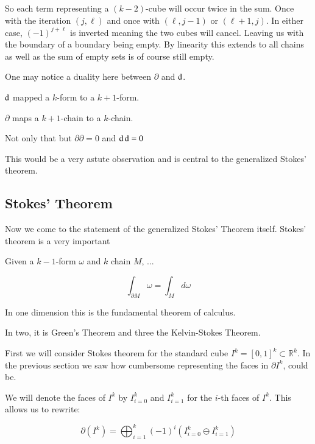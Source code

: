So each term representing a $(k-2)$-cube will occur twice in the sum.
Once with the iteration $(j,\ell)$ and once with $(\ell, j-1)$ or $(\ell+1, j)$.
In either case, $(-1)^{j+\ell}$ is inverted meaning the two cubes will cancel.
Leaving us with the boundary of a boundary being empty.
By linearity this extends to all chains as well as the sum of empty sets is of course still empty.


One may notice a duality here between $\partial$ and $\mathop{}\!\mathrm{d}$.

$\mathop{}\!\mathrm{d}$ mapped a $k$-form to a $k+1$-form.

$\partial$ maps a $k+1$-chain to a $k$-chain.

Not only that but $\partial \partial = 0$ and $\mathop{}\!\mathrm{d} \mathop{}\!\mathrm{d} = 0$

This would be a very astute observation and is central to the generalized Stokes' theorem.

%
%
\subsection{Stokes' Theorem}

Now we come to the statement of the generalized Stokes' Theorem itself.
Stokes' theorem is a very important 


Given a $k-1$-form $\omega$ and $k$ chain $M$, ...

\begin{equation}
	\int_{\partial M} \omega = \int_M d\omega
\end{equation}


In one dimension this is the fundamental theorem of calculus.

In two, it is Green's Theorem and three the Kelvin-Stokes Theorem.


First we will consider Stokes theorem for the standard cube $I^k = [0,1]^k \subset \mathbb{R}^k$.
In the previous section we saw how cumbersome representing the faces in $\partial I^k$, could be.


We will denote the faces of $I^k$ by $I^k_{i=0}$ and $I^k_{i=1}$ for the $i$-th faces of $I^k$.
This allows us to rewrite:


\begin{equation}
	\partial (I^k) = \bigoplus_{i=1}^k (-1)^i \left( I^k_{i=0} \ominus I^k_{i=1} \right) 
\end{equation}



